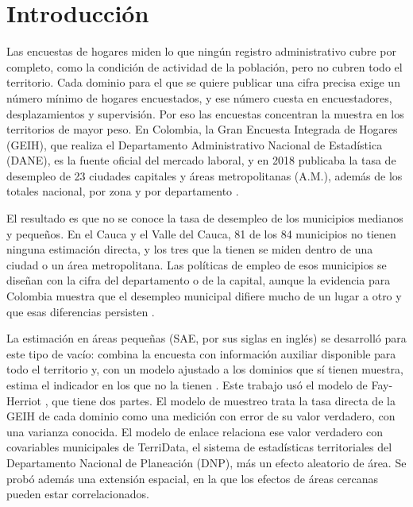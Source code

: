 \chapter*{Introducción}

Las encuestas de hogares miden lo que ningún registro administrativo cubre por completo, como la condición de actividad de la población, pero no cubren todo el territorio. Cada dominio para el que se quiere publicar una cifra precisa exige un número mínimo de hogares encuestados, y ese número cuesta en encuestadores, desplazamientos y supervisión. Por eso las encuestas concentran la muestra en los territorios de mayor peso. En Colombia, la Gran Encuesta Integrada de Hogares (GEIH), que realiza el Departamento Administrativo Nacional de Estadística (DANE), es la fuente oficial del mercado laboral, y en 2018 publicaba la tasa de desempleo de 23 ciudades capitales y áreas metropolitanas (A.M.), además de los totales nacional, por zona y por departamento \cite[p.~9]{DANE_GEIH_Metodologia2016}.

El resultado es que no se conoce la tasa de desempleo de los municipios medianos y pequeños. En el Cauca y el Valle del Cauca, 81 de los 84 municipios no tienen ninguna estimación directa, y los tres que la tienen se miden dentro de una ciudad o un área metropolitana. Las políticas de empleo de esos municipios se diseñan con la cifra del departamento o de la capital, aunque la evidencia para Colombia muestra que el desempleo municipal difiere mucho de un lugar a otro y que esas diferencias persisten \cite[pp.~124--125]{Diaz2016}.

La estimación en áreas pequeñas (SAE, por sus siglas en inglés) se desarrolló para este tipo de vacío: combina la encuesta con información auxiliar disponible para todo el territorio y, con un modelo ajustado a los dominios que sí tienen muestra, estima el indicador en los que no la tienen \cite[p.~17]{Molina2019}. Este trabajo usó el modelo de Fay-Herriot \cite{FayHerriot1979}, que tiene dos partes. El modelo de muestreo trata la tasa directa de la GEIH de cada dominio como una medición con error de su valor verdadero, con una varianza conocida. El modelo de enlace relaciona ese valor verdadero con covariables municipales de TerriData, el sistema de estadísticas territoriales del Departamento Nacional de Planeación (DNP), más un efecto aleatorio de área. Se probó además una extensión espacial, en la que los efectos de áreas cercanas pueden estar correlacionados.

